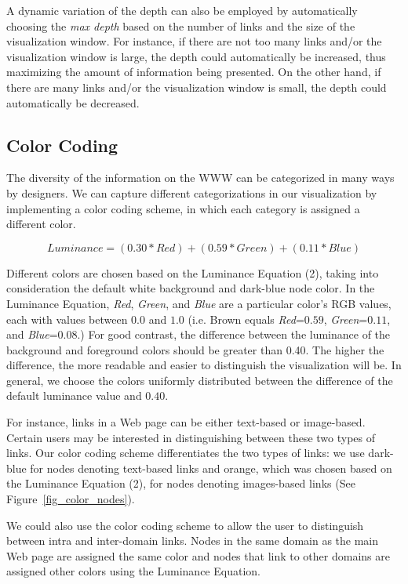 \documentclass[10pt,psfig]{article}
\begin{document}
{A dynamic variation of the depth can also be employed by automatically choosing the {\em max depth} based on the number of links and the size of the visualization window.
For instance, if there are not too many links and/or the visualization window is large, the depth could automatically be increased, thus maximizing the amount of information being presented.
On the other hand, if there are many links and/or the visualization window is small, the depth could automatically be decreased.

\subsection{Color Coding}
\label{ss:color_coding}

The diversity of the information on the WWW can be categorized in many ways by designers.
We can capture different categorizations in our visualization by implementing a color coding scheme, in which each category is assigned a different color.

\begin{equation}
 Luminance = (0.30*Red) + (0.59*Green) + (0.11*Blue)
\end{equation}
\label{lum_eq}

Different colors are chosen based on the Luminance Equation (2), taking into consideration the default white background and dark-blue node color.
In the Luminance Equation, {\em Red}, {\em Green}, and {\em Blue} are a particular color's RGB values, each with values between $0.0$ and $1.0$ (i.e. Brown equals {\em Red}=$0.59$, {\em Green}=$0.11$, and {\em Blue}=$0.08$.)
For good contrast, the difference between the luminance of the background and foreground colors should be greater than 0.40.
The higher the difference, the more readable and easier to distinguish the visualization will be.
In general, we choose the colors uniformly distributed between the difference of the default luminance value and $0.40$.

For instance, links in a Web page can be either text-based or image-based.
Certain users may be interested in distinguishing between these two types of links.
Our color coding scheme differentiates the two types of links: we use dark-blue for nodes denoting text-based links and orange, which was chosen based on the Luminance Equation (2), for nodes denoting images-based links (See Figure~\ref{fig_color_nodes}).

We could also use the color coding scheme to allow the user to distinguish between intra and inter-domain links.
Nodes in the same domain as the main Web page are assigned the same color and nodes that link to other domains are assigned other colors using the Luminance Equation.

}
\end{document}
